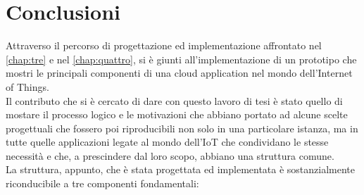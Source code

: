\chapter{Conclusioni}
\label{chap:conclusioni}
Attraverso il percorso di progettazione ed implementazione affrontato nel \autoref{chap:tre} e nel \autoref{chap:quattro}, si è giunti all'implementazione di un prototipo che mostri le principali componenti di una cloud application nel mondo dell'Internet of Things.\\
Il contributo che si è cercato di dare con questo lavoro di tesi è stato quello di mostare il processo logico e le motivazioni che abbiano portato ad alcune scelte progettuali che fossero poi riproducibili non solo in una particolare istanza, ma in tutte quelle applicazioni legate al mondo dell'IoT che condividano le stesse necessità e che, a prescindere dal loro scopo, abbiano una struttura comune.\\
La struttura, appunto, che è stata progettata ed implementata è sostanzialmente riconducibile a tre componenti fondamentali:
